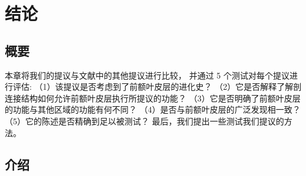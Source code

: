 \chapter{结论} \label{chap:chap10}

\section{概要}
本章将我们的提议与文献中的其他提议进行比较，
并通过 5 个测试对每个提议进行评估:
（1）该提议是否考虑到了前额叶皮层的进化史？
（2）它是否解释了解剖连接结构如何允许前额叶皮层执行所提议的功能？
（3）它是否明确了前额叶皮层的功能与其他区域的功能有何不同？
（4）是否与前额叶皮层的广泛发现相一致？
（5）它的陈述是否精确到足以被测试？
最后，我们提出一些测试我们提议的方法。


\section{介绍}

